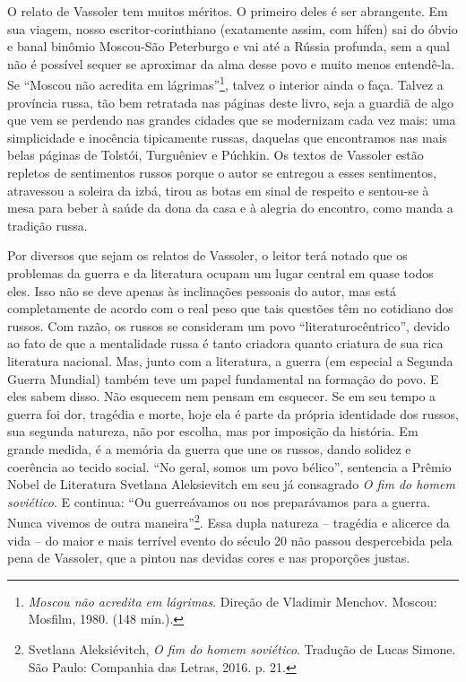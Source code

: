 O relato de Vassoler tem muitos méritos. O primeiro deles é ser
abrangente. Em sua viagem, nosso escritor-corinthiano (exatamente assim,
com hífen) sai do óbvio e banal binômio Moscou-São Peterburgo e vai até
a Rússia profunda, sem a qual não é possível sequer se aproximar da alma
desse povo e muito menos entendê-la. Se ``Moscou não acredita em
lágrimas''\footnote{\emph{Moscou não acredita em lágrimas}. Direção de
  Vladimir Menchov. Moscou: Mosfilm, 1980. (148 min.).}, talvez o
interior ainda o faça. Talvez a província russa, tão bem retratada nas
páginas deste livro, seja a guardiã de algo que vem se perdendo nas
grandes cidades que se modernizam cada vez mais: uma simplicidade e
inocência tipicamente russas, daquelas que encontramos nas mais belas
páginas de Tolstói, Turguêniev e Púchkin. Os textos de Vassoler estão
repletos de sentimentos russos porque o autor se entregou a esses
sentimentos, atravessou a soleira da izbá, tirou as botas em sinal de
respeito e sentou-se à mesa para beber à saúde da dona da casa e à
alegria do encontro, como manda a tradição russa.

Por diversos que sejam os relatos de Vassoler, o leitor terá notado que
os problemas da guerra e da literatura ocupam um lugar central em quase
todos eles. Isso não se deve apenas às inclinações pessoais do autor,
mas está completamente de acordo com o real peso que tais questões têm
no cotidiano dos russos. Com razão, os russos se consideram um povo
``literaturocêntrico'', devido ao fato de que a mentalidade russa é
tanto criadora quanto criatura de sua rica literatura nacional. Mas,
junto com a literatura, a guerra (em especial a Segunda Guerra Mundial)
também teve um papel fundamental na formação do povo. E eles sabem
disso. Não esquecem nem pensam em esquecer. Se em seu tempo a guerra foi
dor, tragédia e morte, hoje ela é parte da própria identidade dos
russos, sua segunda natureza, não por escolha, mas por imposição da
história. Em grande medida, é a memória da guerra que une os russos,
dando solidez e coerência ao tecido social. ``No geral, somos um povo
bélico'', sentencia a Prêmio Nobel de Literatura Svetlana Aleksievitch
em seu já consagrado \emph{O fim do homem soviético}. E continua: ``Ou
guerreávamos ou nos preparávamos para a guerra. Nunca vivemos de outra
maneira''\footnote{Svetlana Aleksiévitch, \emph{O fim do homem
  soviético}. Tradução de Lucas Simone. São Paulo: Companhia das Letras,
  2016. p. 21.}. Essa dupla natureza -- tragédia e alicerce da vida --
do maior e mais terrível evento do século 20 não passou despercebida
pela pena de Vassoler, que a pintou nas devidas cores e nas proporções
justas.

